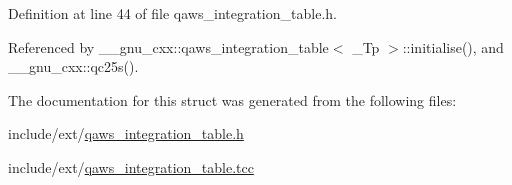Definition at line 44 of file qaws\+\_\+integration\+\_\+table.\+h.



Referenced by \+\_\+\+\_\+gnu\+\_\+cxx\+::qaws\+\_\+integration\+\_\+table$<$ \+\_\+\+Tp $>$\+::initialise(), and \+\_\+\+\_\+gnu\+\_\+cxx\+::qc25s().



The documentation for this struct was generated from the following files\+:\begin{DoxyCompactItemize}
\item 
include/ext/\hyperlink{qaws__integration__table_8h}{qaws\+\_\+integration\+\_\+table.\+h}\item 
include/ext/\hyperlink{qaws__integration__table_8tcc}{qaws\+\_\+integration\+\_\+table.\+tcc}\end{DoxyCompactItemize}
